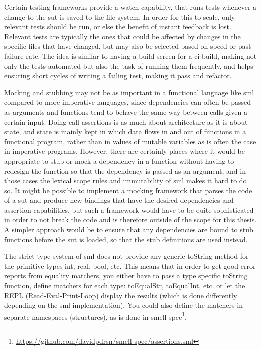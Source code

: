 \documentclass[11pt]{article}
\begin{document}
Certain testing frameworks provide a watch capability, that runs tests whenever a change to the \gls{sut} is saved to the file system. In order for this to scale, only relevant tests should be run, or else the benefit of instant feedback is lost. Relevant tests are typically the ones that could be affected by changes in the specific files that have changed, but may also be selected based on speed or past failure rate. The idea is similar to having a build screen for a \gls{ci} build, making not only the tests automated but also the task of running them frequently, and helps ensuring short cycles of writing a failing test, making it pass and refactor.

Mocking and stubbing may not be as important in a functional language like \gls{sml} compared to more imperative languages, since dependencies can often be passed as arguments and functions tend to behave the same way between calls given a certain input. Doing call assertions is as much about architecture as it is about state, and state is mainly kept in which data flows in and out of functions in a functional program, rather than in values of mutable variables as is often the case in imperative programs. However, there are certainly places where it would be appropriate to stub or mock a dependency in a function without having to redesign the function so that the dependency is passed as an argument, and in those cases the lexical scope rules and immutability of \gls{sml} makes it hard to do so. It might be possible to implement a mocking framework that parses the code of a \gls{sut} and produce new bindings that have the desired dependencies and assertion capabilities, but such a framework would have to be quite sophisticated in order to not break the code and is therefore outside of the scope for this thesis. A simpler approach would be to ensure that any dependencies are bound to stub functions before the \gls{sut} is loaded, so that the stub definitions are used instead. %

The strict type system of \gls{sml} does not provide any generic toString method for the primitive types int, real, bool, etc. This means that in order to get good error reports from equality \glspl{matcher}, you either have to pass a type specific toString function, define \glspl{matcher} for each type: toEqualStr, toEqualInt, etc. or let the REPL (Read-Eval-Print-Loop) display the results (which is done differently depending on the \gls{sml} implementation). You could also define the \glspl{matcher} in separate namespaces (structures), as is done in smell-spec\footnote{\url{https://github.com/davidpdrsn/smell-spec/assertions.sml}}.
\end{document}
